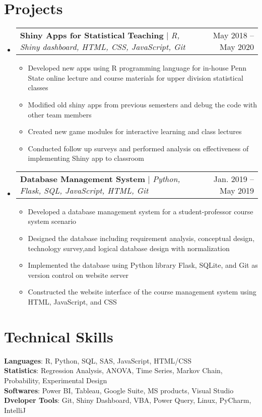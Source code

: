 \documentclass[letterpaper,11pt]{article}
\makeatletter
\newcommand{\resumeItem}[1]{
  \item\small{
    {#1 \vspace{-2pt}}
  }
}
\newcommand{\resumeProjectHeading}[2]{
    \item
    \begin{tabular*}{0.97\textwidth}{l@{\extracolsep{\fill}}r}
      \small#1 & #2 \\
    \end{tabular*}\vspace{-7pt}
}
\newcommand{\resumeSubHeadingListStart}{\begin{itemize}[leftmargin=0.15in, label={}]}
\newcommand{\resumeSubHeadingListEnd}{\end{itemize}}
\newcommand{\resumeItemListStart}{\begin{itemize}}
\newcommand{\resumeItemListEnd}{\end{itemize}\vspace{-5pt}}
\makeatother
\begin{document}
\section{Projects}
    \resumeSubHeadingListStart
      \resumeProjectHeading
          {\textbf{Shiny Apps for Statistical Teaching} $|$ \emph{R, Shiny dashboard, HTML, CSS, JavaScript, Git}}{May 2018 -- May 2020}
          \resumeItemListStart
            \resumeItem{Developed new apps using R programming language for in-house Penn State online lecture and course materials for upper division statistical classes}
            \resumeItem{Modified old shiny apps from previous semesters and debug the code with other team members }
            \resumeItem{Created new game modules for interactive learning and class lectures}
            \resumeItem{Conducted follow up surveys and performed analysis on effectiveness of implementing Shiny app to classroom}
          \resumeItemListEnd
      \resumeProjectHeading
          {\textbf{Database Management System} $|$ \emph{Python, Flask, SQL, JavaScript, HTML, Git}}{Jan. 2019 -- May 2019}
          \resumeItemListStart
            \resumeItem{Developed a database management system for a student-professor course system scenario}
            \resumeItem{Designed the database including requirement analysis, conceptual design, technology survey,and logical database design with normalization}
            \resumeItem{Implemented the database using Python library Flask, SQLite, and Git as version control on website server}
            \resumeItem{Constructed the website interface of the course management system using HTML, JavaScript, and CSS}
          \resumeItemListEnd
    \resumeSubHeadingListEnd



%
\section{Technical Skills}
 \begin{itemize}[leftmargin=0.15in, label={}]
    \small{\item{
     \textbf{Languages}{: R, Python, SQL, SAS, JavaScript, HTML/CSS} \\
     \textbf{Statistics}{: Regression Analysis, ANOVA, Time Series, Markov Chain, Probability, Experimental Design} \\
     \textbf{Softwares}{: Power BI, Tableau, Google Suite, MS products, Visual Studio} \\
     \textbf{Dveloper Tools}{: Git, Shiny Dashboard, VBA, Power Query, Linux, PyCharm, IntelliJ}
    }}
 \end{itemize}


\end{document}
